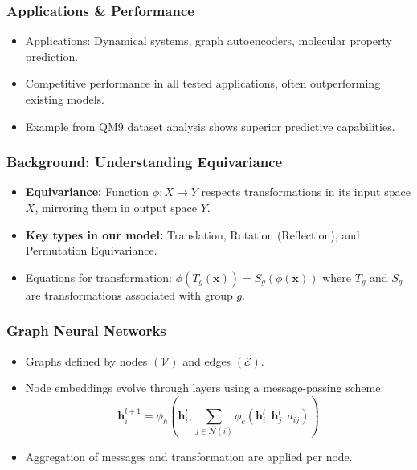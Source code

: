 \documentclass[11pt,xcolor={dvipsnames},hyperref={pdftex,pdfpagemode=UseNone,hidelinks,pdfdisplaydoctitle=true},usepdftitle=false]{beamer}
\newcommand{\rmh}{\mathbf{h}}
\newcommand{\rmx}{\mathbf{x}}
\begin{document}
\begin{frame}
\frametitle{Applications \& Performance}
\begin{itemize}
    \item Applications: Dynamical systems, graph autoencoders, molecular property prediction.
    \item Competitive performance in all tested applications, often outperforming existing models.
    \item Example from QM9 dataset analysis shows superior predictive capabilities.
\end{itemize}
\end{frame}


\begin{frame}
\frametitle{Background: Understanding Equivariance}
\begin{itemize}
      \item \textbf{Equivariance:} Function $\phi: X \to Y$ respects transformations in its input space $X$, mirroring them in output space $Y$.
      \item \textbf{Key types in our model:} Translation, Rotation (Reflection), and Permutation Equivariance.
      \item Equations for transformation: $\phi(T_g(\rmx)) = S_g(\phi(\rmx))$ where $T_g$ and $S_g$ are transformations associated with group $g$.
\end{itemize}
\end{frame}

\begin{frame}
\frametitle{Graph Neural Networks}
\begin{itemize}
      \item Graphs defined by nodes $(\mathcal{V})$ and edges $(\mathcal{E})$.
      \item Node embeddings evolve through layers using a message-passing scheme:
    \begin{equation}
    \rmh_i^{l+1} = \phi_h(\rmh_i^l, \sum_{j \in \mathcal{N}(i)} \phi_e(\rmh_i^l, \rmh_j^l, a_{ij}))
    \end{equation}
      \item Aggregation of messages and transformation are applied per node.
\end{itemize}
\end{frame}
\end{document}
